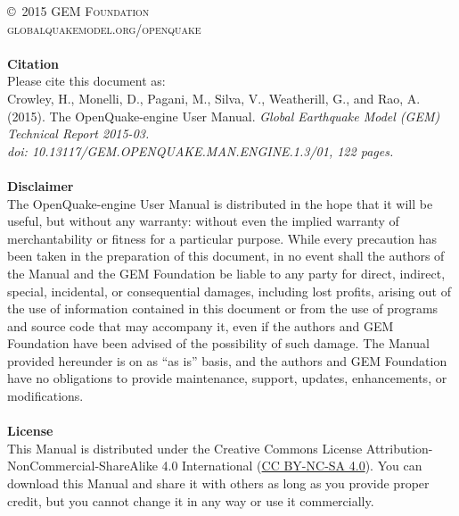 \documentclass[11pt,fleqn]{book} %
\begin{document}
\noindent \copyright\ \textsc{2015 GEM Foundation}\\ %
\noindent \textsc{globalquakemodel.org/openquake}\\ %
\noindent \hfill\\
\noindent
   {\textbf{Citation}} \hfill \\
   Please cite this document as: \hfill \\
   Crowley, H., Monelli, D., Pagani, M., Silva, V., 
   Weatherill, G., and Rao, A. (2015). 
   The OpenQuake-engine User Manual. 
   \textit{Global Earthquake Model (GEM) Technical Report 2015-03.\\ 
   doi: 10.13117/GEM.OPENQUAKE.MAN.ENGINE.1.3/01, 122 pages.} \hfill \\
\noindent \hfill\\
\noindent
   {\bf{Disclaimer}} \hfill \\
   The OpenQuake-engine User Manual is distributed in the hope that it will be 
   useful, but without any warranty: without even the implied warranty of 
   merchantability or fitness for a particular purpose. While every precaution 
   has been taken in the preparation of this document, in no event shall the 
   authors of the Manual and the GEM Foundation be liable to any party for 
   direct, indirect, special, incidental, or consequential damages, including 
   lost profits, arising out of the use of information contained in this 
   document or from the use of programs and source code that may accompany it, 
   even if the authors and GEM Foundation have been advised of the possibility 
   of such damage. The Manual provided hereunder is on as ``as is'' basis, and the 
   authors and GEM Foundation have no obligations to provide maintenance, 
   support, updates, enhancements, or modifications. \hfill \\
\noindent \hfill\\
\noindent
   {\bf{License}} \hfill \\
   This Manual is distributed under the Creative Commons License 
   Attribution-NonCommercial-ShareAlike 4.0 International 
   (\href{http://creativecommons.org/licenses/by-nc-sa/4.0/}
   {CC BY-NC-SA 4.0}). 
   You can download this Manual and share it with 
   others as long as you provide proper credit, but you cannot change 
   it in any way or use it commercially.\hfill \\
\end{document}
